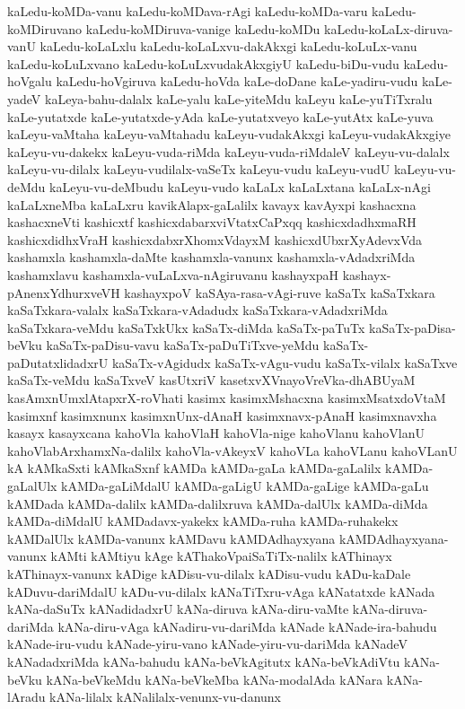{kaLedu-koMDa-vanu
kaLedu-koMDava-rAgi
kaLedu-koMDa-varu
kaLedu-koMDiruvano
kaLedu-koMDiruva-vanige
kaLedu-koMDu
kaLedu-koLaLx-diruva-vanU
kaLedu-koLaLxlu
kaLedu-koLaLxvu-dakAkxgi
kaLedu-koLuLx-vanu
kaLedu-koLuLxvano
kaLedu-koLuLxvudakAkxgiyU
kaLedu-biDu-vudu
kaLedu-hoVgalu
kaLedu-hoVgiruva
kaLedu-hoVda
kaLe-doDane
kaLe-yadiru-vudu
kaLe-yadeV
kaLeya-bahu-dalalx
kaLe-yalu
kaLe-yiteMdu
kaLeyu
kaLe-yuTiTxralu
kaLe-yutatxde
kaLe-yutatxde-yAda
kaLe-yutatxveyo
kaLe-yutAtx
kaLe-yuva
kaLeyu-vaMtaha
kaLeyu-vaMtahadu
kaLeyu-vudakAkxgi
kaLeyu-vudakAkxgiye
kaLeyu-vu-dakekx
kaLeyu-vuda-riMda
kaLeyu-vuda-riMdaleV
kaLeyu-vu-dalalx
kaLeyu-vu-dilalx
kaLeyu-vudilalx-vaSeTx
kaLeyu-vudu
kaLeyu-vudU
kaLeyu-vu-deMdu
kaLeyu-vu-deMbudu
kaLeyu-vudo
kaLaLx
kaLaLxtana
kaLaLx-nAgi
kaLaLxneMba
kaLaLxru
kavikAlapx-gaLalilx
kavayx
kavAyxpi
kashacxna
kashacxneVti
kashicxtf
kashicxdabarxviVtatxCaPxqq
kashicxdadhxmaRH
kashicxdidhxVraH
kashicxdabxrXhomxVdayxM
kashicxdUbxrXyAdevxVda
kashamxla
kashamxla-daMte
kashamxla-vanunx
kashamxla-vAdadxriMda
kashamxlavu
kashamxla-vuLaLxva-nAgiruvanu
kashayxpaH
kashayx-pAnenxYdhurxveVH
kashayxpoV
kaSAya-rasa-vAgi-ruve
kaSaTx
kaSaTxkara
kaSaTxkara-valalx
kaSaTxkara-vAdadudx
kaSaTxkara-vAdadxriMda
kaSaTxkara-veMdu
kaSaTxkUkx
kaSaTx-diMda
kaSaTx-paTuTx
kaSaTx-paDisa-beVku
kaSaTx-paDisu-vavu
kaSaTx-paDuTiTxve-yeMdu
kaSaTx-paDutatxlidadxrU
kaSaTx-vAgidudx
kaSaTx-vAgu-vudu
kaSaTx-vilalx
kaSaTxve
kaSaTx-veMdu
kaSaTxveV
kasUtxriV
kasetxvXVnayoVreVka-dhABUyaM
kasAmxnUmxlAtapxrX-roVhati
kasimx
kasimxMshacxna
kasimxMsatxdoVtaM
kasimxnf
kasimxnunx
kasimxnUnx-dAnaH
kasimxnavx-pAnaH
kasimxnavxha
kasayx
kasayxcana
kahoVla
kahoVlaH
kahoVla-nige
kahoVlanu
kahoVlanU
kahoVlabArxhamxNa-dalilx
kahoVla-vAkeyxV
kahoVLa
kahoVLanu
kahoVLanU
kA
kAMkaSxti
kAMkaSxnf
kAMDa
kAMDa-gaLa
kAMDa-gaLalilx
kAMDa-gaLalUlx
kAMDa-gaLiMdalU
kAMDa-gaLigU
kAMDa-gaLige
kAMDa-gaLu
kAMDada
kAMDa-dalilx
kAMDa-dalilxruva
kAMDa-dalUlx
kAMDa-diMda
kAMDa-diMdalU
kAMDadavx-yakekx
kAMDa-ruha
kAMDa-ruhakekx
kAMDalUlx
kAMDa-vanunx
kAMDavu
kAMDAdhayxyana
kAMDAdhayxyana-vanunx
kAMti
kAMtiyu
kAge
kAThakoVpaiSaTiTx-nalilx
kAThinayx
kAThinayx-vanunx
kADige
kADisu-vu-dilalx
kADisu-vudu
kADu-kaDale
kADuvu-dariMdalU
kADu-vu-dilalx
kANaTiTxru-vAga
kANatatxde
kANada
kANa-daSuTx
kANadidadxrU
kANa-diruva
kANa-diru-vaMte
kANa-diruva-dariMda
kANa-diru-vAga
kANadiru-vu-dariMda
kANade
kANade-ira-bahudu
kANade-iru-vudu
kANade-yiru-vano
kANade-yiru-vu-dariMda
kANadeV
kANadadxriMda
kANa-bahudu
kANa-beVkAgitutx
kANa-beVkAdiVtu
kANa-beVku
kANa-beVkeMdu
kANa-beVkeMba
kANa-modalAda
kANara
kANa-lAradu
kANa-lilalx
kANalilalx-venunx-vu-danunx
}
